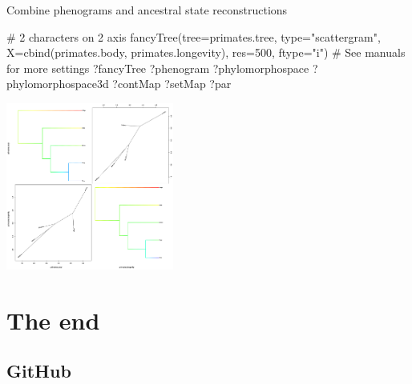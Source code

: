\documentclass[compress, ucs, xelatex, 11pt, xcolor=svgnames,
  hyperref={
    bookmarks=true,
    unicode=true,
    colorlinks=true,
    pdftitle={Molecular data in R},
    plainpages=false,
    pdfauthor={Vojtech Zeisek},
    pdfsubject={Course about phylogeny and evolution in R},
    pdfcreator={XeLaTeX},
    pdfkeywords={R, evolution, phylogeny, molecular data},
    linkcolor=Tomato,
    anchorcolor=SaddleBrown,
    citecolor=Goldenrod,
    filecolor=DarkMagenta,
    menucolor=Sienna,
    urlcolor=DarkTurquoise,
    pdftex},
  url={hyphens, lowtilde} %
  ]{beamer}
\begin{document}
\begin{frame}[fragile]{Combine phenograms and ancestral state reconstructions}
\begin{multicols}{2}
  \begin{spluscode}
    # 2 characters on 2 axis
    fancyTree(tree=primates.tree,
      type="scattergram",
      X=cbind(primates.body,
      primates.longevity),
      res=500, ftype="i")
    # See manuals for more settings
    ?fancyTree
    ?phenogram
    ?phylomorphospace
    ?phylomorphospace3d
    ?contMap
    ?setMap
    ?par
  \end{spluscode}
  \begin{center}
    \includegraphics[height=5.5cm]{phenogram-ace.png}
  \end{center}
\end{multicols}
\end{frame}

%

\section{The end}

\subsection{GitHub}
\end{document}
